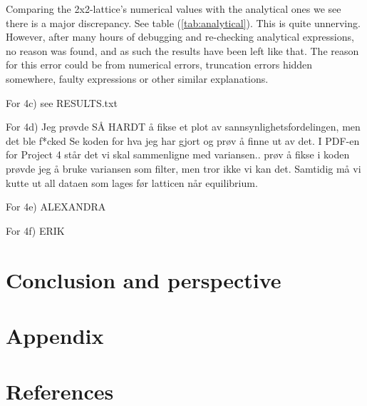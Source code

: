 \documentclass{article}
\begin{document}
Comparing the 2x2-lattice's numerical values with the analytical ones we see there is a major discrepancy. See table (\ref{tab:analytical}). This is quite unnerving. However, after many hours of debugging and re-checking analytical expressions, no reason was found, and as such the results have been left like that. The reason for this error could be from numerical errors, truncation errors hidden somewhere, faulty expressions or other similar explanations.

For 4c) see RESULTS.txt

For 4d) Jeg prøvde SÅ HARDT å fikse et plot av sannsynlighetsfordelingen, men det ble f*cked
Se koden for hva jeg har gjort og prøv å finne ut av det.
I PDF-en for Project 4 står det vi skal sammenligne med variansen.. prøv å fikse
i koden prøvde jeg å bruke variansen som filter, men tror ikke vi kan det. Samtidig må vi kutte ut all dataen som lages før latticen når equilibrium.

For 4e) ALEXANDRA

For 4f) ERIK


\vspace{1cm}

\section{Conclusion and perspective} \label{sec:Conclusion}



\vspace{1cm}

\section{Appendix} \label{sec:Appendix}





\vspace{1cm}

\section{References} \label{sec:References}
\end{document}
